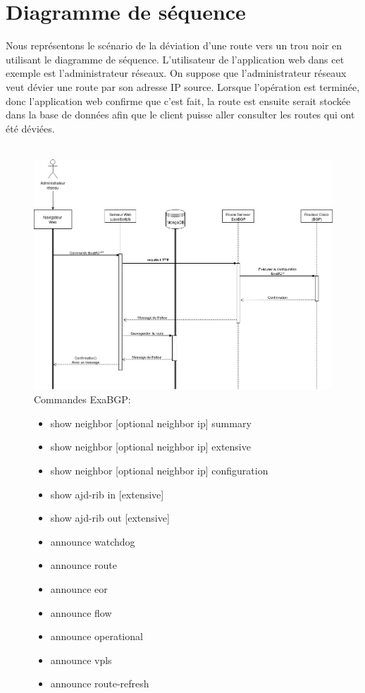 \section{Diagramme de séquence}
Nous représentons le scénario de la déviation d'une route vers un trou noir en utilisant le diagramme de séquence.
\newline
L'utilisateur de l'application web dans cet exemple est l'administrateur réseaux. On suppose que l'administrateur réseaux veut dévier une route par son adresse IP source. 
\newline
Lorsque l'opération est terminée, donc l'application web confirme que c'est fait, la route est ensuite serait stockée dans la base de données afin que le client puisse aller consulter les routes qui ont été déviées.
\\
\\
\begin{figure}[h]
\includegraphics[scale = 0.5]{img/diagramme_de_sequence.png}
Commandes ExaBGP:
\begin{itemize}
\item show neighbor [optional neighbor ip] summary
\item show neighbor [optional neighbor ip] extensive
\item show neighbor [optional neighbor ip] configuration
\item show ajd-rib in [extensive] 
\item show ajd-rib out [extensive] 
\item announce watchdog
\item announce route 
\item announce eor
\item announce flow
\item announce operational
\item announce vpls
\item announce route-refresh
\end{itemize}
\end{figure}


